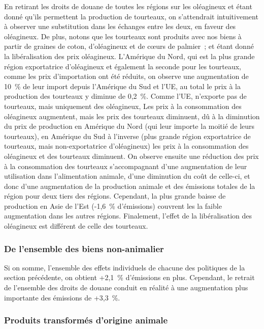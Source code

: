 En retirant les droits de douane de toutes les régions sur les oléagineux et étant donné qu'ils permettent la production de tourteaux, on s'attendrait intuitivement à observer une substitution dans les échanges entre les deux, en faveur des oléagineux. De plus, notons que les tourteaux sont produits avec nos biens à partir de graines de coton, d'oléagineux et de cœurs de palmier~; et étant donné la libéralisation des prix oléagineux. L'Amérique du Nord, qui est la plus grande région exportatrice d'oléagineux et également la seconde pour les tourteaux, comme les prix d'importation ont été réduits, on observe une augmentation de 10~\% de leur import depuis l'Amérique du Sud et l'UE, au total le prix à la production des tourteaux y diminue de 0,2~\%. Comme l'UE, n'exporte pas de tourteaux, mais uniquement des oléagineux, Les prix à la consommation des oléagineux augmentent, mais les prix des tourteaux diminuent, dû à la diminution du prix de production en Amérique du Nord (qui leur importe la moitié de leurs tourteaux), en Amérique du Sud à l'inverse (plus grande région exportatrice de tourteaux, mais non-exportatrice d'oléagineux) les prix à la consommation des oléagineux et des tourteaux diminuent. On observe ensuite une réduction des prix à la consommation des tourteaux s'accompagnant d'une augmentation de leur utilisation dans l'alimentation animale, d'une diminution du coût de celle-ci, et donc d'une augmentation de la production animale et des émissions totales de la région pour deux tiers des régions. Cependant, la plus grande baisse de production en Asie de l'Est (-1,6~\% d'émissions) couvrent les la faible augmentation dans les autres régions. Finalement, l'effet de la libéralisation des oléagineux est différent de celle des tourteaux.


\subsubsection{De l'ensemble des biens non-animalier}\label{sousec_all_non_kl}

Si on somme, l'ensemble des effets individuels de chacune des politiques de la section précédente, on obtient +2,1~\% d'émissions en plus. Cependant, le retrait de l'ensemble des droits de douane conduit en réalité à une augmentation plus importante des émissions de +3,3~\%.


\subsubsection{Produits transformés d'origine animale}


